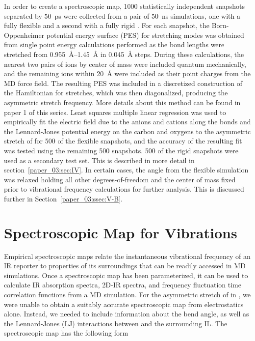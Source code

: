 In order to create a spectroscopic map, \num{1000} statistically independent snapshots separated by \SI{50}{\pico\second} were collected from a pair of \SI{50}{\nano\second} simulations, one with a fully flexible  and a second with a fully rigid . For each snapshot, the Born-Oppenheimer potential energy surface (PES) for  stretching modes was obtained from single point energy calculations performed as the  bond lengths were stretched from \SIrange{0.955}{1.45}{\angstrom} in \SI{0.045}{\angstrom} steps. During these calculations, the nearest two pairs of ions by center of mass were included quantum mechanically, and the remaining ions within \SI{20}{\angstrom} were included as their point charges from the MD force field. The resulting PES was included in a discretized construction of the Hamiltonian for  stretches, which was then diagonalized, producing the asymmetric stretch frequency. More details about this method can be found in paper 1 of this series. Least squares multiple linear regression was used to empirically fit the electric field due to the anions and cations along the  bonds and the Lennard-Jones potential energy on the  carbon and oxygens to the asymmetric stretch of  for \num{500} of the flexible snapshots, and the accuracy of the resulting fit was tested using the remaining \num{500} snapshots. \num{500} of the rigid snapshots were used as a secondary test set. This is described in more detail in section~\ref{paper_03:sec:IV}. In certain cases, the  angle from the flexible simulation was relaxed holding all other degrees-of-freedom and the  center of mass fixed prior to vibrational frequency calculations for further analysis. This is discussed further in Section~\ref{paper_03:ssec:V-B}.

\section{Spectroscopic Map for  Vibrations}
\label{paper_03:sec:III}

Empirical spectroscopic maps relate the instantaneous vibrational frequency of an IR reporter to properties of its surroundings that can be readily accessed in MD simulations.\cite{lin_water_2009-1,61,85} Once a spectroscopic map has been parameterized, it can be used to calculate IR absorption spectra, 2D-IR spectra, and frequency fluctuation time correlation functions from a MD simulation. For the asymmetric stretch of  in \ce{[C4C1im][PF6]}, we were unable to obtain a suitably accurate spectroscopic map from electrostatics alone. Instead, we needed to include information about the  bend angle, as well as the Lennard-Jones (LJ) interactions between  and the surrounding IL. The spectroscopic map has the following form

